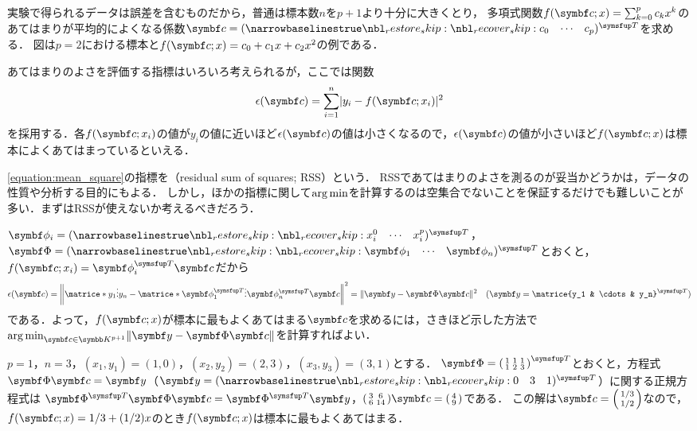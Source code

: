 \documentclass[../../main]{subfiles}
\begin{document}
実験で得られるデータは誤差を含むものだから，普通は標本数\(n\)を\(p+1\)より十分に大きくとり，
多項式関数\(f(\vect{c};x)=\sum_{k=0}^pc_kx^k\)のあてはまりが平均的によくなる係数\(\vect{c}=\trps{\rowvect{c_0 & \cdots & c_p}}\)を求める．
図は\(p=2\)における標本と\(f(\vect{c};x)=c_0+c_1x+c_2x^2\)の例である．

あてはまりのよさを評価する指標はいろいろ考えられるが，ここでは関数
\begin{equation}
  \label{equation:mean_square}
  \epsilon(\vect{c}) = \sum_{i=1}^n\abs{y_i-f(\vect{c};x_i)}^2
\end{equation}
を採用する．各\(f(\vect{c};x_i)\)の値が\(y_i\)の値に近いほど\(\epsilon(\vect{c})\)の値は小さくなるので，\(\epsilon(\vect{c})\)の値が小さいほど\(f(\vect{c};x)\)は標本によくあてはまっているといえる．

\begin{note}
  \cref{equation:mean_square}の指標を（residual sum of squares; RSS）という．
  RSSであてはまりのよさを測るのが妥当かどうかは，データの性質や分析する目的にもよる．
  しかし，ほかの指標に関して\(\operatorname*{arg\,min}\)を計算するのは\texttwoemdash 空集合でないことを保証するだけでも\texttwoemdash 難しいことが多い．まずはRSSが使えないか考えるべきだろう．
\end{note}

\(\vect{\phi}_i=\trps{\rowvect{x_i^0 & \cdots & x_i^p}}\)，\(\mat{\Phi}=\trps{\rowvect{\vect{\phi}_1 & \cdots & \vect{\phi}_n}}\)とおくと，\(f(\vect{c};x_i)=\trps{\vect{\phi}_i}\vect{c}\)だから
\[
  \epsilon(\vect{c}) = \vnorm*{\matrice*{y_1 \\ \vdots \\ y_n}-\matrice*{\trps{\vect{\phi}_1} \\ \vdots \\ \trps{\vect{\phi}_n}}\vect{c}}^2
  = \vnorm{\vect{y}-\mat{\Phi}\vect{c}}^2\quad(\vect{y}=\trps{\matrice{y_1 & \cdots & y_n}})
\]
である．よって，\(f(\vect{c};x)\)が標本に最もよくあてはまる\(\vect{c}\)を求めるには，さきほど示した方法で\(\argmin_{\vect{c}\in\numset{K}^{p+1}}\vnorm{\vect{y}-\mat{\Phi}\vect{c}}\)を計算すればよい．

\begin{example}
  \label{example:linear_regression}
  \(p=1\)，\(n=3\)，\((x_1,y_1)=(1,0)\)，\((x_2,y_2)=(2,3)\)，\((x_3,y_3)=(3,1)\)とする．
  \(\mat{\Phi}=\trps{\smallmatrice{1 & 1 & 1 \\ 1 & 2 & 3}}\)とおくと，方程式\(\mat{\Phi}\vect{c}=\vect{y}\)（\(\vect{y}=\trps{\rowvect{0 & 3 & 1}}\)）に関する正規方程式は
  \(\trps{\mat{\Phi}}\mat{\Phi}\vect{c}=\trps{\mat{\Phi}}\vect{y}\)，\(\smallmatrice{3 & 6 \\ 6 & 14}\vect{c}=\smallmatrice{4 \\ 9}\)である．
  この解は\(\vect{c}=\smallmatrice{1/3 \\ 1/2}\)なので，\(f(\vect{c};x)=1/3+(1/2)x\)のとき\(f(\vect{c};x)\)は標本に最もよくあてはまる．
\end{example}
\end{document}
